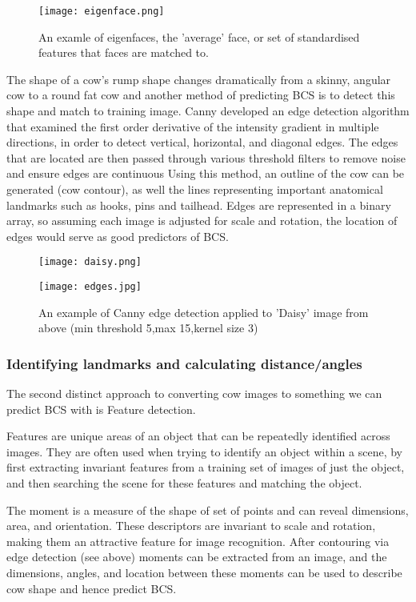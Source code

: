 \documentclass[11pt]{article}
\begin{document}
	\begin{figure}[b!]
		\centering
		\texttt{[image: eigenface.png]}
		\caption{An examle of eigenfaces, the 'average' face, or set of standardised features that faces are matched to.}
		\label{fig:<+label+>}
	\end{figure}
\newpage

	The shape of a cow's rump shape changes dramatically from a skinny, angular cow to a round fat cow and another method of predicting BCS is to detect this shape and match to training image.
	Canny developed an edge detection algorithm that examined the first order derivative of the intensity gradient in multiple directions, in order to detect vertical, horizontal, and diagonal edges\cite{Canny1986}.
	The edges that are located are then passed through various threshold filters to remove noise and ensure edges are continuous
	Using this method, an outline of the cow can be generated (cow contour), as well the lines representing important anatomical landmarks such as hooks, pins and tailhead.
	Edges are represented in a binary array, so assuming each image is adjusted for scale and rotation, the location of edges would serve as good predictors of BCS.


	\begin{figure}[h!]
		\centering
		\parbox{5cm}{\texttt{[image: daisy.png]}}
		\parbox{6cm}{\texttt{[image: edges.jpg]}}
		\caption{An example of Canny edge detection applied to 'Daisy' image from above (min threshold 5,max 15,kernel size 3) }
		\label{fig:}
	\end{figure}
\newpage


	\subsubsection{Identifying landmarks and calculating distance/angles}

	The second distinct approach to converting cow images to something we can predict BCS with is Feature detection.


	Features are unique areas of an object that can be repeatedly identified across images.
	They are often used when trying to identify an object within a scene, by first extracting invariant features from a training set of images of just the object, and then searching the scene for these features and matching the object.


	The moment is a measure of the shape of set of points and can reveal dimensions, area, and orientation. 
	These descriptors are invariant to scale and rotation, making them an attractive feature for image recognition.
	After contouring via edge detection (see above) moments can be extracted from an image, and the dimensions, angles, and location between these moments can be used to describe cow shape and hence predict BCS.
\end{document}
